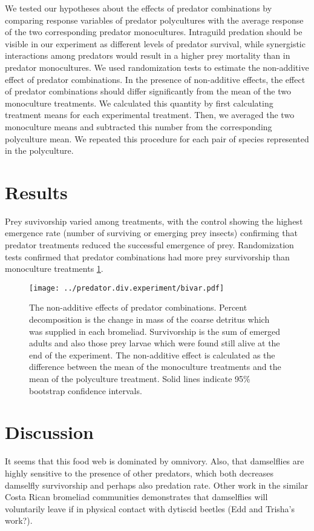 \documentclass[10pt]{article}
\begin{document}
\begin{spacing}{2}
We tested our hypotheses about the effects of predator combinations by
comparing response variables of predator polycultures with the average
response of the two corresponding predator monocultures. Intraguild
predation should be visible in our experiment as different levels of
predator survival, while synergistic interactions among predators
would result in a higher prey mortality than in predator
monocultures. We used randomization tests to estimate the non-additive
effect of predator combinations.  In the presence of non-additive
effects, the effect of predator combinations should differ
significantly from the mean of the two monoculture treatments.  We
calculated this quantity by first calculating treatment means for each
experimental treatment.  Then, we averaged the two monoculture means
and subtracted this number from the corresponding polyculture mean.
We repeated this procedure for each pair of species represented in the
polyculture.

\section{Results}

Prey suvivorship varied among treatments, with the control showing the
highest emergence rate (number of surviving or emerging prey insects)
confirming that predator treatments reduced the successful emergence
of prey. Randomization tests confirmed that predator combinations had
more prey survivorship than monoculture treatments \ref{fig:prednonadd}.


\begin{figure}
  \centering
  \texttt{[image: ../predator.div.experiment/bivar.pdf]}
  \caption{The non-additive effects of predator combinations. Percent
    decomposition is the change in mass of the coarse detritus which
    was supplied in each bromeliad.  Survivorship is the sum of
    emerged adults and also those prey larvae which were found still
    alive at the end of the experiment.  The non-additive effect is
    calculated as the difference between the mean of the monoculture
    treatments and the mean of the polyculture treatment. Solid lines
    indicate 95\% bootstrap confidence intervals.}
\label{fig:prednonadd}
\end{figure}


\section{Discussion}

It seems that this food web is dominated by omnivory.  Also, that
damselflies are highly sensitive to the presence of other predators,
which both decreases damselfly survivorship and perhaps also predation
rate.  Other work in the similar Costa Rican bromeliad communities
demonstrates that damselflies will voluntarily leave if in physical
contact with dytiscid beetles (Edd and Trisha's work?).

\end{spacing}

 
\end{document}
